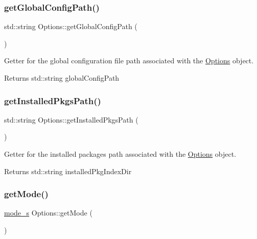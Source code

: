 \subsubsection{\texorpdfstring{getGlobalConfigPath()}{getGlobalConfigPath()}}
{\footnotesize\ttfamily std\+::string Options\+::get\+Global\+Config\+Path (\begin{DoxyParamCaption}{ }\end{DoxyParamCaption})}



Getter for the global configuration file path associated with the \mbox{\hyperlink{classOptions}{Options}} object. 

\begin{DoxyReturn}{Returns}
std\+::string global\+Config\+Path 
\end{DoxyReturn}
\mbox{\label{classOptions_a25d503327960948c9610586e7a74cad1}} 
\subsubsection{\texorpdfstring{getInstalledPkgsPath()}{getInstalledPkgsPath()}}
{\footnotesize\ttfamily std\+::string Options\+::get\+Installed\+Pkgs\+Path (\begin{DoxyParamCaption}{ }\end{DoxyParamCaption})}



Getter for the installed packages path associated with the \mbox{\hyperlink{classOptions}{Options}} object. 

\begin{DoxyReturn}{Returns}
std\+::string installed\+Pkg\+Index\+Dir 
\end{DoxyReturn}
\mbox{\label{classOptions_a4faeff2138155356b947d9218bbcb558}} 
\subsubsection{\texorpdfstring{getMode()}{getMode()}}
{\footnotesize\ttfamily \mbox{\hyperlink{structmode__s}{mode\+\_\+s}} Options\+::get\+Mode (\begin{DoxyParamCaption}{ }\end{DoxyParamCaption})}



